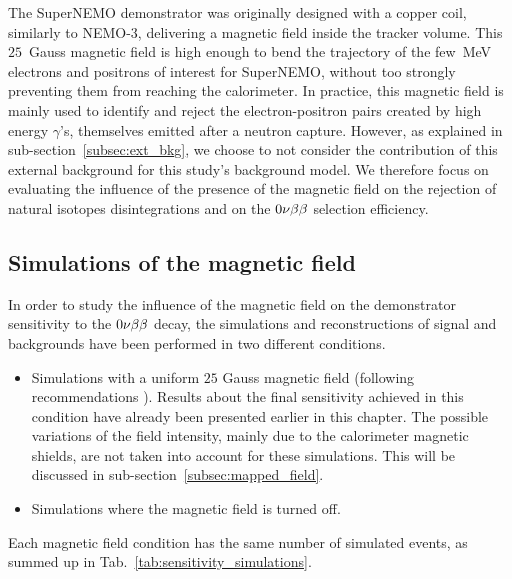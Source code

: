 The SuperNEMO demonstrator was originally designed with a copper coil, similarly to NEMO-$3$, delivering a magnetic field inside the tracker volume.
This $25$~Gauss magnetic field is high enough to bend the trajectory of the few~MeV electrons and positrons of interest for SuperNEMO, without too strongly preventing them from reaching the calorimeter.
In practice, this magnetic field is mainly used to identify and reject the electron-positron pairs created by high energy $\gamma$’s, themselves emitted after a neutron capture.
However, as explained in sub-section~\ref{subsec:ext_bkg}, we choose to not consider the contribution of this external background for this study's background model.
We therefore focus on evaluating the influence of the presence of the magnetic field on the rejection of natural isotopes disintegrations and on the $0\nu\beta\beta$ selection efficiency.





\subsection{Simulations of the magnetic field}

In order to study the influence of the magnetic field on the demonstrator sensitivity to the $0\nu\beta\beta$ decay, the simulations and reconstructions of signal and backgrounds have been performed in two different conditions.
\begin{itemize}
\item Simulations with a uniform $25$ Gauss magnetic field (following recommendations \cite{CalvezThesis}).
  Results about the final sensitivity achieved in this condition have already been presented earlier in this chapter.
  The possible variations of the field intensity, mainly due to the calorimeter magnetic shields, are not taken into account for these simulations.
  This will be discussed in sub-section~\ref{subsec:mapped_field}.
\item Simulations where the magnetic field is turned off.
\end{itemize}
Each magnetic field condition has the same number of simulated events, as summed up in Tab.~\ref{tab:sensitivity_simulations}.

